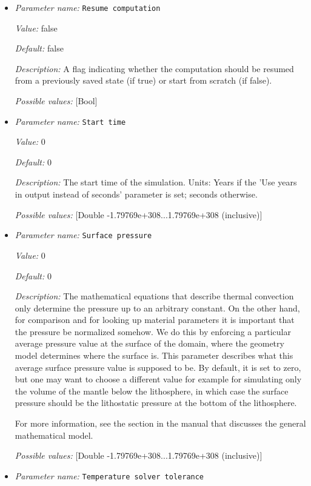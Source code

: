 \begin{itemize}
{\it Possible values:} [Selection surface|volume|no ]
\item {\it Parameter name:} {\tt Resume computation}


{\it Value:} false


{\it Default:} false


{\it Description:} A flag indicating whether the computation should be resumed from a previously saved state (if true) or start from scratch (if false).


{\it Possible values:} [Bool]
\item {\it Parameter name:} {\tt Start time}


{\it Value:} 0


{\it Default:} 0


{\it Description:} The start time of the simulation. Units: Years if the 'Use years in output instead of seconds' parameter is set; seconds otherwise.


{\it Possible values:} [Double -1.79769e+308...1.79769e+308 (inclusive)]
\item {\it Parameter name:} {\tt Surface pressure}


{\it Value:} 0


{\it Default:} 0


{\it Description:} The mathematical equations that describe thermal convection only determine the pressure up to an arbitrary constant. On the other hand, for comparison and for looking up material parameters it is important that the pressure be normalized somehow. We do this by enforcing a particular average pressure value at the surface of the domain, where the geometry model determines where the surface is. This parameter describes what this average surface pressure value is supposed to be. By default, it is set to zero, but one may want to choose a different value for example for simulating only the volume of the mantle below the lithosphere, in which case the surface pressure should be the lithostatic pressure at the bottom of the lithosphere.

For more information, see the section in the manual that discusses the general mathematical model.


{\it Possible values:} [Double -1.79769e+308...1.79769e+308 (inclusive)]
\item {\it Parameter name:} {\tt Temperature solver tolerance}



\end{itemize}
